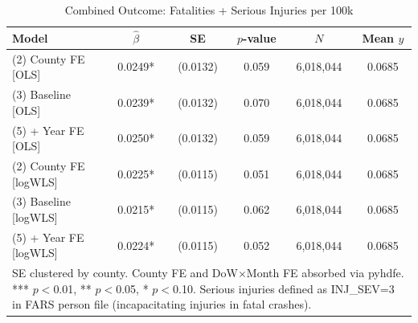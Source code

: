 \begin{table}[htbp]\centering
\caption{Combined Outcome: Fatalities + Serious Injuries per 100k}
\begin{tabular}{lccccc}
\hline\hline
Model & $\hat\beta$ & SE & $p$-value & $N$ & Mean $y$ \\
\midrule
(2) County FE [OLS] & 0.0249* & (0.0132) & 0.059 & 6,018,044 & 0.0685 \\
(3) Baseline [OLS] & 0.0239* & (0.0132) & 0.070 & 6,018,044 & 0.0685 \\
(5) + Year FE [OLS] & 0.0250* & (0.0132) & 0.059 & 6,018,044 & 0.0685 \\
(2) County FE [logWLS] & 0.0225* & (0.0115) & 0.051 & 6,018,044 & 0.0685 \\
(3) Baseline [logWLS] & 0.0215* & (0.0115) & 0.062 & 6,018,044 & 0.0685 \\
(5) + Year FE [logWLS] & 0.0224* & (0.0115) & 0.052 & 6,018,044 & 0.0685 \\
\hline\hline
\multicolumn{6}{p{0.9\textwidth}}{\footnotesize SE clustered by county. County FE and DoW$\times$Month FE absorbed via pyhdfe. *** $p{<}$0.01, ** $p{<}$0.05, * $p{<}$0.10. Serious injuries defined as INJ\_SEV=3 in FARS person file (incapacitating injuries in fatal crashes).} \\
\end{tabular}
\end{table}